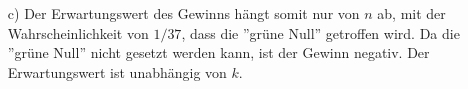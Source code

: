 \begin{enumerate}
	\item[c)] Der Erwartungswert des Gewinns hängt somit nur von $n$ ab, mit der Wahrscheinlichkeit von $1/37$, dass die ''grüne Null'' getroffen wird. Da die ''grüne Null'' nicht gesetzt werden kann, ist der Gewinn negativ. Der Erwartungswert ist unabhängig von $k$.

\end{enumerate}
